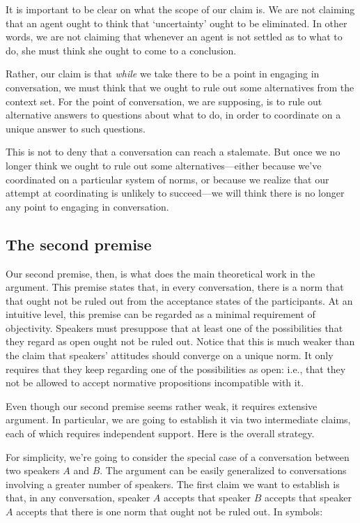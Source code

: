 \documentclass[11pt,article,oneside]{memoir}
\begin{document}
It is important to be clear on what the scope of our claim is. We are not claiming that an agent ought to think that `uncertainty' ought to be eliminated. In other words, we are not claiming that whenever an agent is not settled as to what to do, she must think she ought to come to a conclusion. 

Rather, our claim is that \emph{while} we take there to be a point in engaging in conversation, we must think that we ought to rule out some alternatives from the context set. For the point of conversation, we are supposing, is to rule out alternative answers to questions about what to do, in order to coordinate on a unique answer to such questions. 

This is not to deny that a conversation can reach a stalemate. But once we no longer think we ought to rule out some alternatives---either because we've coordinated on a particular system of norms, or because we realize that our attempt at coordinating is unlikely to succeed---we will think there is no longer any point to engaging in conversation. 

\subsection{The second premise}

Our second premise, then, is what does the main theoretical work in the argument. This premise states that, in every conversation, there is a norm that that ought not be ruled out from the acceptance states of the participants. At an intuitive level, this premise can be regarded as a minimal requirement of objectivity. Speakers must presuppose that at least one of the possibilities that they regard as open ought not be ruled out. Notice that this is much weaker than the claim that speakers' attitudes should converge on a unique norm. It only requires that they keep regarding one of the possibilities as open: i.e., that they not be allowed to accept normative propositions incompatible with it. 

Even though our second premise seems rather weak, it requires extensive argument. In particular, we are going to establish it via two intermediate claims, each of which requires independent support. Here is the overall strategy.

For simplicity, we're going to consider the special case of a conversation between two speakers $A$ and $B$. The argument can be easily generalized to conversations involving a greater number of speakers. The first claim we want to establish is that, in any conversation, speaker $A$ accepts that speaker $B$ accepts that speaker $A$ accepts that there is one norm that ought not be ruled out. In symbols:
\end{document}
